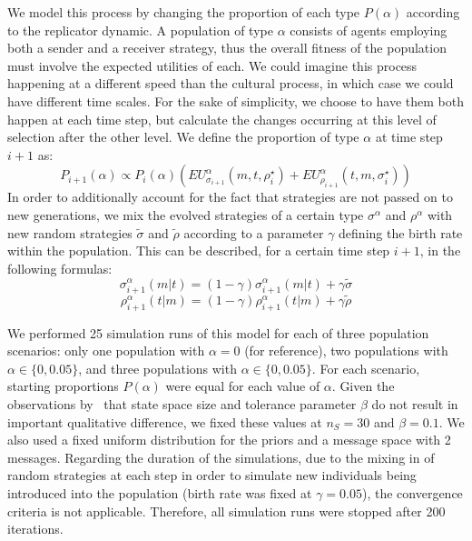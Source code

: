 \documentclass[a4paper]{article}
\begin{document}
We model this process by changing the proportion of each type $P(\alpha)$ according to the replicator dynamic.
A population of type $\alpha$ consists of agents employing both a sender and a receiver strategy, thus the overall fitness of the population must involve the expected utilities of each.
We could imagine this process happening at a different speed than the cultural process, in which case we could have different time scales.
For the sake of simplicity, we choose to have them both happen at each time step, but calculate the changes occurring at this level of selection after the other level.
We define the proportion of type $\alpha$ at time step $i+1$ as:
$$
P_{i+1}(\alpha) \propto P_i(\alpha)(EU_{\sigma_{i+1}}^{\alpha}(m,t,\rho_{i}^{\star}) + EU_{\rho_{i+1}}^{\alpha}(t,m,\sigma_{i}^{\star}))
$$
In order to additionally account for the fact that strategies are not passed on to new generations, we mix the evolved strategies of a certain type $\sigma^\alpha$ and $\rho^\alpha$ with new random strategies $\tilde{\sigma}$ and $\tilde{\rho}$ according to a parameter $\gamma$ defining the birth rate within the population.
This can be described, for a certain time step $i+1$, in the following formulas:
$$
\sigma_{i+1}^{\alpha}(m|t)=(1 - \gamma)\sigma_{i+1}^{\alpha}(m|t) + \gamma \tilde{\sigma}
$$
$$
\rho_{i+1}^{\alpha}(t|m)=(1 - \gamma)\rho_{i+1}^{\alpha}(t|m) + \gamma \tilde{\rho}
$$

We performed 25 simulation runs of this model for each of three population scenarios: only one population with $\alpha = 0$ (for reference), two populations with $\alpha \in \{0, 0.05\}$, and three populations with $\alpha \in \{0, 0.05\}$.
For each scenario, starting proportions $P(\alpha)$ were equal for each value of $\alpha$.
Given the observations by~\textcite{franke_vagueness_2017} that state space size and tolerance parameter $\beta$ do not result in important qualitative difference, we fixed these values at $n_S = 30$ and $\beta = 0.1$.
We also used a fixed uniform distribution for the priors and a message space with 2 messages.
Regarding the duration of the simulations, due to the mixing in of random strategies at each step in order to simulate new individuals being introduced into the population (birth rate was fixed at $\gamma = 0.05$), the convergence criteria is not applicable.
Therefore, all simulation runs were stopped after 200 iterations.
\end{document}
